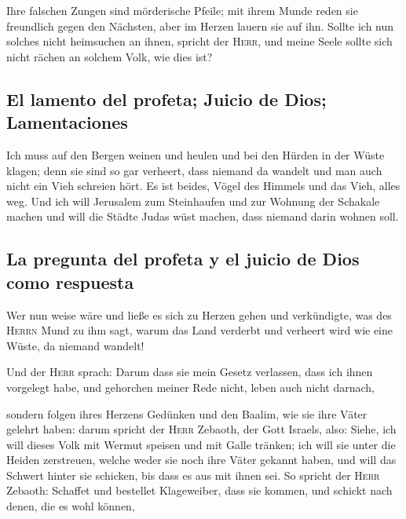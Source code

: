  Ihre falschen Zungen sind mörderische Pfeile; mit ihrem
Munde reden sie freundlich gegen den Nächsten, aber im Herzen lauern sie
auf ihn.  Sollte ich nun solches nicht heimsuchen an
ihnen, spricht der \textsc{Herr}, und meine Seele sollte sich nicht
rächen an solchem Volk, wie dies ist?

\hypertarget{el-lamento-del-profeta-juicio-de-dios-lamentaciones}{%
\subsection{El lamento del profeta; Juicio de Dios;
Lamentaciones}\label{el-lamento-del-profeta-juicio-de-dios-lamentaciones}}

 Ich muss auf den Bergen weinen und heulen und bei den
Hürden in der Wüste klagen; denn sie sind so gar verheert, dass niemand
da wandelt und man auch nicht ein Vieh schreien hört. Es ist beides,
Vögel des Himmels und das Vieh, alles weg.  Und ich will
Jerusalem zum Steinhaufen und zur Wohnung der Schakale machen und will
die Städte Judas wüst machen, dass niemand darin wohnen soll.

\hypertarget{la-pregunta-del-profeta-y-el-juicio-de-dios-como-respuesta}{%
\subsection{La pregunta del profeta y el juicio de Dios como
respuesta}\label{la-pregunta-del-profeta-y-el-juicio-de-dios-como-respuesta}}

 Wer nun weise wäre und ließe es sich zu Herzen gehen und
verkündigte, was des \textsc{Herrn} Mund zu ihm sagt, warum das Land
verderbt und verheert wird wie eine Wüste, da niemand wandelt!

 Und der \textsc{Herr} sprach: Darum dass sie mein Gesetz
verlassen, dass ich ihnen vorgelegt habe, und gehorchen meiner Rede
nicht, leben auch nicht darnach,

 sondern folgen ihres Herzens Gedünken und den Baalim,
wie sie ihre Väter gelehrt haben:  darum spricht der
\textsc{Herr} Zebaoth, der Gott Israels, also: Siehe, ich will dieses
Volk mit Wermut speisen und mit Galle tränken;  ich will
sie unter die Heiden zerstreuen, welche weder sie noch ihre Väter
gekannt haben, und will das Schwert hinter sie schicken, bis dass es aus
mit ihnen sei.  So spricht der \textsc{Herr} Zebaoth:
Schaffet und bestellet Klageweiber, dass sie kommen, und schickt nach
denen, die es wohl können,

